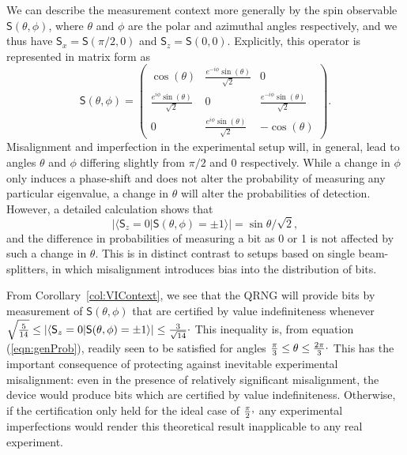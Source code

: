 \documentclass[%
 preprint,
 showpacs,
 showkeys,
 amsmath,
 amssymb,
 aps,
 pra,
 ]{revtex4-1}
\theoremstyle{definition}
\newcommand{\iprod}[2]{\langle #1 | #2 \rangle}
\begin{document}
We can describe the measurement context more generally by the spin observable $\textsf{S}(\theta,\phi)$,
where $\theta$ and $\phi$ are the polar and azimuthal angles respectively, and we thus have $\textsf{S}_x=\textsf{S}(\pi/2,0)$
and
 $\textsf{S}_z=\textsf{S}(0,0)$.
Explicitly, this operator is represented in matrix form as
\begin{equation}
\textsf{S}(\theta,\phi )
=
\left(
\begin{array}{ccc}
 \cos (\theta ) & \frac{e^{-i \phi } \sin (\theta )}{\sqrt{2}} & 0 \\
 \frac{e^{i \phi } \sin (\theta )}{\sqrt{2}} & 0 & \frac{e^{-i \phi } \sin (\theta )}{\sqrt{2}} \\
 0 & \frac{e^{i \phi } \sin (\theta )}{\sqrt{2}} & -\cos (\theta )
\end{array}
\right).
\end{equation}
Misalignment and imperfection in the experimental setup will, in general, lead to angles $\theta$ and $\phi$ differing slightly from $\pi/2$ and 0 respectively.
While a change in $\phi$ only induces a phase-shift and does not alter the probability of measuring any particular eigenvalue, a change in $\theta$ will alter the probabilities of detection.
However, a detailed calculation shows that \begin{equation}\label{eqn:genProb}|\iprod{\textsf{S}_z=0}{\textsf{S}(\theta,\phi)=\pm 1}|=\sin\theta/\sqrt{2},\end{equation} and the difference in probabilities of measuring a bit as 0 or 1 is not affected by such a change in $\theta$.
This is in distinct contrast to setups based on single beam-splitters, in which misalignment introduces bias into the distribution of bits.

From Corollary~\ref{col:VIContext}, we see that the QRNG will provide bits by measurement of $\textsf{S}(\theta,\phi)$ that are certified by value indefiniteness whenever $\sqrt{\frac{5}{14}} \le |\iprod{\textsf{S}_z=0}{\textsf{S}(\theta,\phi)=\pm 1}| \le \frac{3}{\sqrt{14}}\raisebox{.8mm}{.}$
This inequality is, from equation (\ref{eqn:genProb}), readily seen to be satisfied for angles $\frac{\pi}{3} \le \theta \le \frac{2 \pi}{3}\raisebox{.8mm}{.}$
This has the important consequence of protecting against inevitable experimental misalignment: even in the presence of relatively significant misalignment, the device would produce bits which are certified by value indefiniteness.
Otherwise, if the certification only held for the ideal case of $\frac{\pi}{2}\raisebox{.8mm}{,}$ any experimental imperfections would render this theoretical result inapplicable to any real experiment.
\end{document}
